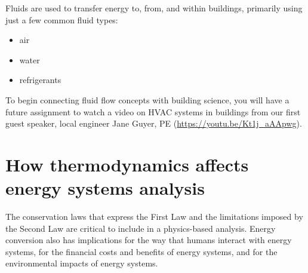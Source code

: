 \documentclass[10pt]{article}
\begin{document}
Fluids are used to transfer energy to, from, and within buildings, primarily using just a few common fluid types:
\begin{itemize}
\item air
\item water 
\item refrigerants
\end{itemize}
To begin connecting fluid flow concepts with building science, you will have a future assignment to watch a video on HVAC systems in buildings from our first guest speaker, local engineer Jane Guyer, PE (\url{https://youtu.be/Kt1j_aAApwg}).


\section{How thermodynamics affects energy systems analysis}

The conservation laws that express the First Law and the limitations imposed by the Second Law are critical to include in a physics-based analysis. Energy conversion also has implications for the way that humans interact with energy systems, for the financial costs and benefits of energy systems, and for the environmental impacts of energy systems.








\end{document}
